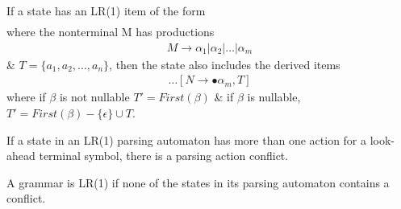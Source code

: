 If a state has an LR(1) item of the form
\begin{align*}
    [N \rightarrow \alpha \bullet M \beta, T]
\end{align*}
where the nonterminal M has productions
\begin{align*}
    M \rightarrow \alpha_1 | \alpha_2 | \dots | \alpha_m
\end{align*}
\& $T = \{a_1, a_2, \dots, a_n\}$, then the state also includes the derived items
\begin{align*}
    [N \rightarrow \bullet \alpha_1, T]
    \dots
    [N \rightarrow \bullet \alpha_m, T]
\end{align*}
where if $\beta$ is not nullable $T' = First(\beta)$ \& if $\beta$ is nullable, 
$T' = First(\beta) - \{\epsilon\} \cup T$.

If a state in an LR(1) parsing automaton has more than one action for a look-ahead 
terminal symbol, there is a parsing action conflict.

A grammar is LR(1) if none of the states in its parsing automaton contains a conflict.